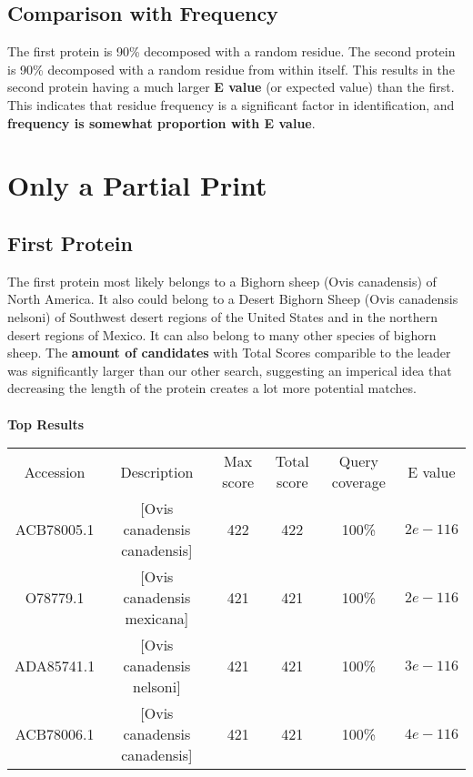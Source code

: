 \documentclass[12pt]{article}
\begin{document}
		\subsection{Comparison with Frequency}
		The first protein is 90\% decomposed with a random residue. The second protein is 90\% decomposed with a random residue from within itself. This results in the second protein having a much larger \textbf{E value} (or expected value) than the first. This indicates that residue frequency is a significant factor in identification, and \textbf{frequency is somewhat proportion with E value}.


	\section{Only a Partial Print}
		\subsection{First Protein}
		The first protein most likely belongs to a Bighorn sheep (Ovis canadensis) of North America. It also could belong to a Desert Bighorn Sheep (Ovis canadensis nelsoni) of Southwest desert regions of the United States and in the northern desert regions of Mexico. It can also belong to many other species of bighorn sheep. The \textbf{amount of candidates} with Total Scores comparible to the leader was significantly larger than our other search, suggesting an imperical idea that decreasing the length of the protein creates a lot more potential matches.
		\\ \\ 
		\textbf{Top Results} \\
		\scriptsize
		\begin{tabular}{|c|c|c|c|c|c|}
			\hline
			Accession	&	Description	&	Max score	&	Total score	&	Query coverage	&	E value \\
			ACB78005.1	&	[Ovis canadensis canadensis]	&	422	&	422	&	100\%	&	$2e-116$ \\
			O78779.1	&	[Ovis canadensis mexicana]	&	421	&	421	&	100\%	&	$2e-116$ \\
			ADA85741.1	&	[Ovis canadensis nelsoni]	&	421	&	421	&	100\%	&	$3e-116$ \\
			ACB78006.1 	&	[Ovis canadensis canadensis] &	421	&	421	&	100\%	&	$4e-116$ \\
			\hline
		\end{tabular} \\
		\normalsize
\end{document}
